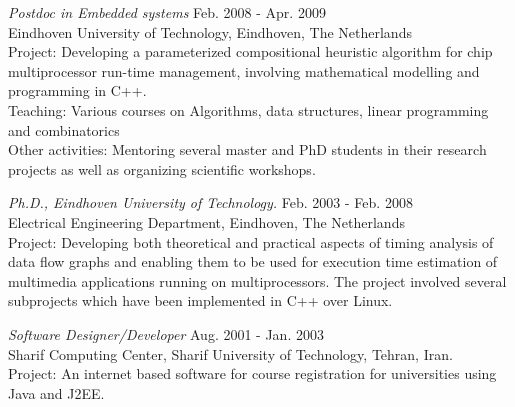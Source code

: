 {\sl Postdoc in Embedded systems}  \hfill Feb. 2008 - Apr. 2009 \\
Eindhoven University of Technology, Eindhoven, The Netherlands \\
\ifindustry
Project: Developing a parameterized compositional heuristic algorithm for chip multiprocessor run-time management, involving mathematical modelling and programming in C++.\\
Teaching: Various courses on Algorithms, data structures, linear programming and combinatorics \\
Other activities: Mentoring several master and PhD students in their research projects as well as organizing scientific workshops.
\fi

{\sl Ph.D., Eindhoven University of Technology.} \hfill Feb. 2003 - Feb. 2008 \\
Electrical Engineering Department, Eindhoven, The Netherlands \\
\ifindustry
Project: Developing both theoretical and practical aspects of timing analysis of data flow graphs
and enabling them to be used for execution time estimation of multimedia applications running on multiprocessors.
The project involved several subprojects which have been implemented in C++ over Linux.
\fi

{\sl Software Designer/Developer}  \hfill Aug. 2001 - Jan. 2003 \\
Sharif Computing Center, Sharif University of Technology, Tehran, Iran. \\
\ifindustry
Project: An internet based software for course registration for universities using Java and J2EE.
\fi
